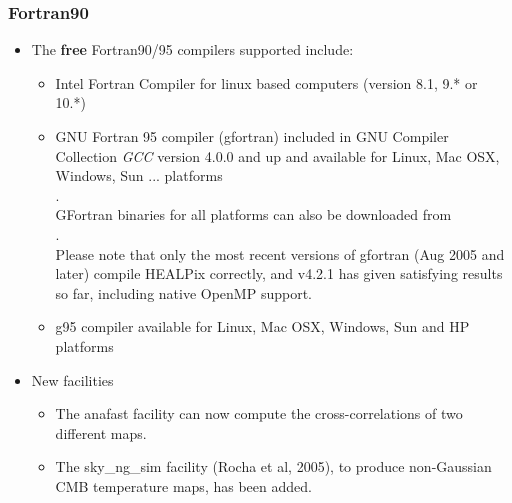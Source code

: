 \documentclass[12pt,twoside]{article}
\begin{document}
{{\subsubsection[New Features: Fortran90]{Fortran90}
\label{sec:freef90compilers}
  \begin{itemize}
    \item The {\bf free} Fortran90/95 compilers supported include: 
    \begin{itemize}
      \item Intel Fortran Compiler for linux based computers (version 8.1, 9.* or 10.*) \hfill \\
      \item GNU Fortran 95 compiler (gfortran) included in GNU Compiler Collection {\em GCC} version 4.0.0
         and up and available for Linux, Mac OSX, Windows, Sun ... platforms
         \hfill \\
          . \hfill \\
         GFortran binaries for all platforms can also be downloaded from  \hfill \\
          . \hfill \\
         Please note that only the most recent versions of gfortran (Aug 2005
         and later) compile HEALPix correctly, and v4.2.1 has given satisfying
         results so far, including native OpenMP support.
     \item g95 compiler available for Linux, Mac OSX, Windows, Sun and HP platforms
         \hfill \\ 
    \end{itemize}
\item New facilities
\begin{itemize}
\item The anafast facility can now compute the cross-correlations of two different
maps. 
\item The sky\_ng\_sim facility (Rocha et al, 2005), to produce non-Gaussian CMB temperature maps,
has been added.
\end{itemize}

\end{itemize}}}
\end{document}
